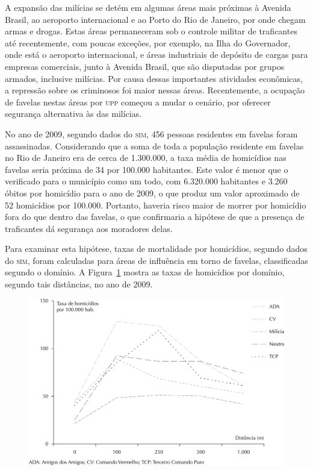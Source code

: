 \documentclass{article}
\begin{document}
A expansão das milícias se detém em algumas áreas mais próximas à Avenida
Brasil, ao aeroporto internacional e ao Porto do Rio de Janeiro, por onde chegam
armas e drogas. Estas áreas permaneceram sob o controle militar de traficantes
até recentemente, com poucas exceções, por exemplo, na Ilha do Governador, onde
está o aeroporto internacional, e áreas industriais de depósito de cargas para
empresas comerciais, junto à Avenida Brasil, que são disputadas por grupos
armados, inclusive milícias. Por causa dessas importantes atividades econômicas,
a repressão sobre os criminosos foi maior nessas áreas. Recentemente, a ocupação
de favelas nestas áreas por \textsc{upp} começou a mudar o cenário, por oferecer
segurança alternativa às das milícias.

No ano de 2009, segundo dados do \textsc{sim}, 456 pessoas residentes em favelas foram
assassinadas. Considerando que a soma de toda a população residente em favelas
no Rio de Janeiro era de cerca de 1.300.000, a taxa média de homicídios nas
favelas seria próxima de 34 por 100.000 habitantes. Este valor é menor que o
verificado para o município como um todo, com 6.320.000 habitantes e 3.260
óbitos por homicídio para o ano de 2009, o que produz um valor aproximado de 52
homicídios por 100.000. Portanto, haveria risco maior de morrer por homicídio
fora do que dentro das favelas, o que confirmaria a hipótese de que a presença
de traficantes dá segurança aos moradores delas.

Para examinar esta hipótese, taxas de mortalidade por homicídios, segundo dados
do \textsc{sim}, foram calculadas para áreas de influência em torno de favelas,
classificadas segundo o domínio. A Figura~\ref{fig:f02}
mostra as taxas de homicídios por domínio, segundo tais distâncias, no ano de
2009.

\begin{figure}
\includegraphics[width=\textwidth]{0034-8910-rsp-48-01-0094-gf02}
\caption{}\label{fig:f02}
\end{figure}
\end{document}
